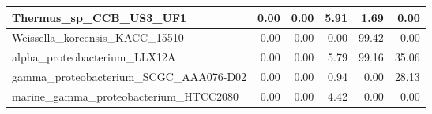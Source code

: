 \documentclass[12pt,a4paper]{article}
\begin{document}
\begin{table}[ht]
\begin{center}
\begin{tabular}{|l*{5}{|r}|}
Thermus\_sp\_CCB\_US3\_UF1 & 0.00 & 0.00 & 5.91 & 1.69 & 0.00 \\ \hline
Weissella\_koreensis\_KACC\_15510 & 0.00 & 0.00 & 0.00 & 99.42 & 0.00 \\ \hline
alpha\_proteobacterium\_LLX12A & 0.00 & 0.00 & 5.79 & 99.16 & 35.06 \\ \hline
gamma\_proteobacterium\_SCGC\_AAA076-D02 & 0.00 & 0.00 & 0.94 & 0.00 & 28.13 \\ \hline
marine\_gamma\_proteobacterium\_HTCC2080 & 0.00 & 0.00 & 4.42 & 0.00 & 0.00 \\ \hline
\end{tabular}
\end{center}
\end{table}
\end{document}
